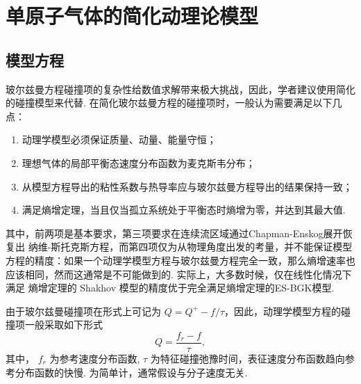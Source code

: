 
\chapter{单原子气体的简化动理论模型}


\section{模型方程}

玻尔兹曼方程碰撞项的复杂性给数值求解带来极大挑战\cite{Wu2017Physica}，因此，学者建议使用简化的碰撞模型来代替. 在简化玻尔兹曼方程的碰撞项时，一般认为需要满足以下几点：
\begin{enumerate}
	\item 动理学模型必须保证质量、动量、能量守恒；
	\item 理想气体的局部平衡态速度分布函数为麦克斯韦分布；
	\item 从模型方程导出的粘性系数与热导率应与玻尔兹曼方程导出的结果保持一致；
	\item 满足熵增定理，当且仅当孤立系统处于平衡态时熵增为零，并达到其最大值. 
\end{enumerate}
其中，前两项是基本要求，第三项要求在连续流区域通过Chapman-Enskog展开恢复出 纳维-斯托克斯方程，而第四项仅为从物理角度出发的考量，并不能保证模型方程的精度：如果一个动理学模型方程与玻尔兹曼方程完全一致，那么熵增速率也应该相同，然而这通常是不可能做到的. 实际上，大多数时候，仅在线性化情况下满足 熵增定理的 Shakhov 模型的精度优于完全满足熵增定理的ES-BGK模型. 


由于玻尔兹曼碰撞项在形式上可记为 $Q=Q^+ -f/\tau$，因此，动理学模型方程的碰撞项一般采取如下形式
\begin{equation}\label{overall_kinetic_model}
Q=\frac{f_{r}-f}{\tau},
\end{equation}
其中， $f_{r}$ 为参考速度分布函数, $\tau$ 为特征碰撞弛豫时间，表征速度分布函数趋向参考分布函数的快慢. 为简单计，通常假设与分子速度无关. 




